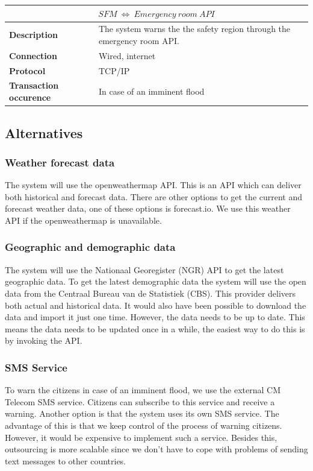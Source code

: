 \begin{table}[!htbp]
	\centering
	\begin{tabular}{L{} L{}}
		\toprule
		 \\ \midrule
		\textbf{Description}           & The system warns the the safety region through the emergency room API. \\
		\textbf{Connection}            & Wired, internet                                                        \\
		\textbf{Protocol}              & TCP/IP                                                                 \\
		\textbf{Transaction occurence} & In case of an imminent flood                                           \\
		\bottomrule
	\end{tabular}
\end{table}


\subsection{Alternatives}
\label{subsec:system-alter}
\subsubsection*{Weather forecast data}
The system will use the openweathermap API. This is an API which can deliver both historical and forecast data. There are other options to get the current and forecast weather data, one of these options is forecast.io. We use this weather API if the openweathermap is unavailable. 

\subsubsection*{Geographic and demographic data}
The system will use the Nationaal Georegister (NGR) API to get the latest geographic data. To get the latest demographic data the system will use the open data from the Centraal Bureau van de Statistiek (CBS). This provider delivers both actual and historical data. It would also have been possible to download the data and import it just one time. However, the data needs to be up to date. This means the data needs to be updated once in a while, the easiest way to do this is by invoking the API.

\subsubsection*{SMS Service}
To warn the citizens in case of an imminent flood, we use the external CM Telecom SMS service. Citizens can subscribe to this service and receive a warning. Another option is that the system uses its own SMS service. The advantage of this is that we keep control of the process of warning citizens. However, it would be expensive to implement such a service. Besides this, outsourcing is more scalable since we don't have to cope with problems of sending text messages to other countries.

